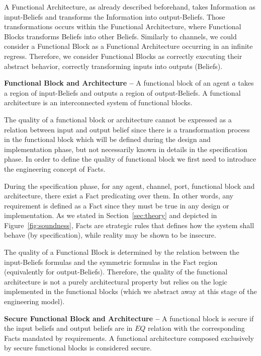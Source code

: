A Functional Architecture, as already described beforehand, takes Information as input-Beliefs
and transforms the Information into output-Beliefs. Those transformations 
occurs within the Functional Architecture, where Functional Blocks transforms Beliefs into 
other Beliefs. Similarly to channels, we could consider a Functional Block as a Functional Architecture
occurring in an infinite regress. Therefore, we consider Functional Blocks as 
correctly executing their abstract behavior, correctly transforming inputs into outputs (Beliefs).

\begin{definition}{\bf Functional Block and Architecture --}\label{def:funblock}
	A functional block of an agent $a$ 
	takes a region of input-Beliefs and outputs a region of output-Beliefs. 
	A functional architecture is an interconnected system of functional blocks.
\end{definition}
The quality of a functional block or architecture cannot be expressed as a relation 
between input and output belief since there is a transformation process in the functional
block which will be defined during the design and implementation phase, but not
necessarily known in details in the specification phase. In order to
define the quality of functional block we first need to introduce the engineering concept of
Facts.

During the specification phase, for any agent, channel, port, functional block
and architecture, there exist a Fact predicating over them.
In other words, any requirement is defined as a Fact since they must be true in
any design or implementation. As we stated in Section~\ref{sec:theory} and depicted in
Figure~\ref{fig:soundness}, Facts are strategic rules that defines how
the system shall behave (by specification), while reality may be shown to
be insecure.

The quality of a Functional Block is determined by the relation between the
input-Beliefs formulas and the symmetric formulas in the Fact region
(equivalently for output-Beliefs). Therefore, the quality of the functional
architecture is not a purely architectural property but relies on the logic
implemented in the functional blocks (which we abstract away at this stage of
the engineering model).
\begin{definition}{\bf Secure Functional Block and Architecture --}\label{def:secfun}
	A functional block is secure if the input beliefs and output beliefs
	are in $EQ$ relation with the corresponding Facts mandated by requirements.
	A functional architecture composed exclusively by secure functional blocks
	is considered secure.
\end{definition}

